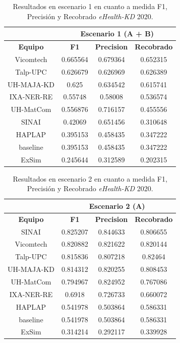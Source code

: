 \begin{table}[tb!]\centering
	\caption{Resultados en escenario 1 en cuanto a medida F1, Precisi\'on y Recobrado \textit{eHealth-KD} 2020. \label{table:results_20_escenario1}}
	\begin{tabular}{|c|c|c|c|}
		\hline
		&  \multicolumn{3}{c|}{\textbf{Escenario 1 (A + B)}} \\
		\hline
		\textbf{Equipo} & \textbf{F1} & \textbf{Precision} & \textbf{Recobrado} \\
		\hline
		Vicomtech & 0.665564 & 0.679364 & 0.652315  \\
		Talp-UPC & 0.626679 & 0.626969 & 0.626389 \\
		UH-MAJA-KD & 0.625 & 0.634542 & 0.615741 \\
		IXA-NER-RE & 0.55748 & 0.58008 & 0.536574 \\
		UH-MatCom & 0.556876 & 0.716157 & 0.455556 \\
		SINAI & 0.42069 & 0.651456 & 0.310648 \\
		HAPLAP & 0.395153 & 0.458435 & 0.347222 \\
		baseline & 0.395153 & 0.458435 & 0.347222 \\
		ExSim & 0.245644 & 0.312589 & 0.202315 \\	
		\hline
	\end{tabular}
\end{table}

\begin{table}[tb!]\centering
	\caption{Resultados en escenario 2 en cuanto a medida F1, Precisi\'on y Recobrado \textit{eHealth-KD} 2020. \label{table:results_20_escenario2}}
	\begin{tabular}{|c|c|c|c|}
		\hline
		&  \multicolumn{3}{c|}{\textbf{Escenario 2 (A)}} \\
		\hline
		\textbf{Equipo} & \textbf{F1} & \textbf{Precision} & \textbf{Recobrado} \\
		\hline
		SINAI & 0.825207 & 0.844633 & 0.806655 \\
		Vicomtech & 0.820882 & 0.821622 & 0.820144 \\
		Talp-UPC & 0.815836 & 0.807218 & 0.82464 \\
		UH-MAJA-KD & 0.814312 & 0.820255 & 0.808453 \\
		UH-MatCom & 0.794967 & 0.824952 & 0.767086 \\
		IXA-NER-RE & 0.6918 & 0.726733 & 0.660072 \\
		HAPLAP & 0.541978 & 0.503864 & 0.586331 \\
		baseline & 0.541978 & 0.503864 & 0.586331 \\
		ExSim & 0.314214 & 0.292117 & 0.339928 \\	
		\hline
	\end{tabular}
\end{table}

